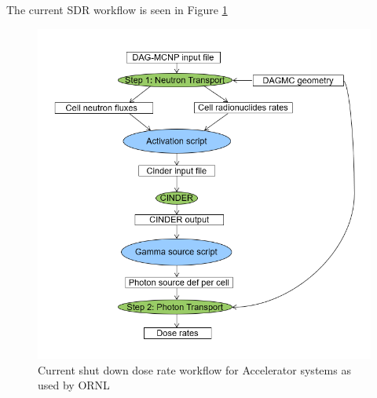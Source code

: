 The current SDR workflow is seen in Figure \ref{rnucs_r2s}
\begin{figure}[h!]
\begin{centering}
\includegraphics[scale=0.4]{../figs/rnucs_r2s.png}
\caption{Current shut down dose rate workflow for Accelerator systems as used by ORNL}
\label{rnucs_r2s}
\end{centering}
\end{figure}
\newpage
